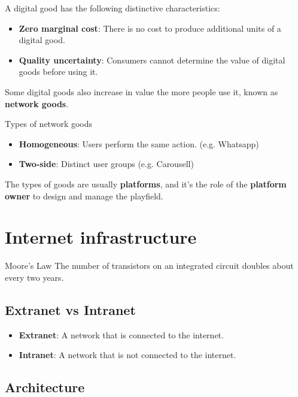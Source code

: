 \documentclass{article}
\begin{document}
A digital good has the following distinctive characteristics:

\begin{itemize}
    \item \textbf{Zero marginal cost}: There is no cost to produce additional units of a digital good.
    \item \textbf{Quality uncertainty}: Consumers cannot determine the value of digital goods before using it.
\end{itemize}

Some digital goods also increase in value the more people use it, known as \textbf{network goods}.

\begin{definition}
    {Types of network goods}
    \begin{itemize}
        \item \textbf{Homogeneous}: Users perform the same action. (e.g. Whatsapp)
        \item \textbf{Two-side}: Distinct user groups (e.g. Carousell)
    \end{itemize}
    The types of goods are usually \textbf{platforms}, and it's the role of the \textbf{platform owner} to design and manage the playfield.
\end{definition}

\section{Internet infrastructure}

\begin{theorem}
    {Moore's Law}
    The number of transistors on an integrated circuit doubles about every two years.
\end{theorem}

\subsection{Extranet vs Intranet}

\begin{itemize}
    \item \textbf{Extranet}: A network that is connected to the internet.
    \item \textbf{Intranet}: A network that is not connected to the internet.
\end{itemize}

\subsection{Architecture}
\end{document}
